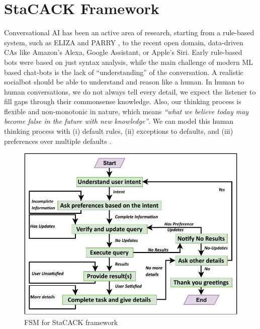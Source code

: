 \documentclass[letterpaper]{article}
\begin{document}
\section{StaCACK Framework} 
Conversational AI has been an active area of research, starting from a rule-based system, such as ELIZA \cite{eliza} and PARRY \cite{parry}, to the recent open domain, data-driven CAs like Amazon's Alexa, Google Assistant, or Apple's Siri. Early rule-based bots were based on just syntax analysis, while the main challenge of modern ML based chat-bots is the lack of ``understanding'' of the conversation. 
A realistic socialbot should be able to understand and reason like a human. In human to human conversations, we do not always tell every detail, we expect the listener to fill gaps through their commonsense knowledge. Also, our thinking process is flexible and non-monotonic in nature, which means \textit{``what we believe today may become false in the future with new knowledge''}. We can model this human thinking process with (i) default rules, (ii) exceptions to defaults, and (iii) preferences over multiple defaults \cite{asp}.

\begin{figure}[h]
    \centering
    \includegraphics[scale = 0.73]{FSM}
    \caption{FSM for StaCACK framework}
    \label{fig:FSM_StaCACK}
\end{figure}
\end{document}
